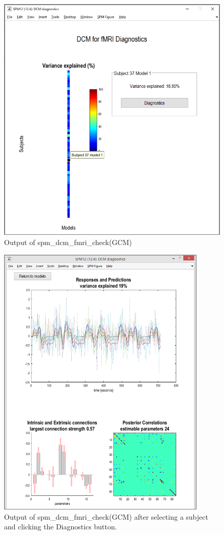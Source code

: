 \documentclass{article}
\begin{document}
\begin{figure}[h]
\begin{center}
\includegraphics{"Fig_spm_dcm_fmri_check_part1"}
\caption{Output of spm\_dcm\_fmri\_check(GCM) \label{Fig_spm_dcm_fmri_check_part1}}
\end{center}
\end{figure}

\begin{figure}[ht]
\begin{center}
\includegraphics[width=10cm]{"Fig_spm_dcm_fmri_check_part2"}
\caption{Output of spm\_dcm\_fmri\_check(GCM) after selecting a subject and clicking the Diagnostics button.\label{Fig_spm_dcm_fmri_check_part2}}
\end{center}
\end{figure}
\end{document}
